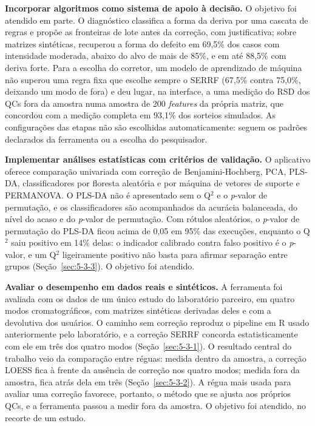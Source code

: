 \textbf{Incorporar algoritmos como sistema de apoio à decisão.} O objetivo foi atendido em parte. O diagnóstico classifica a forma da deriva por uma cascata de regras e propõe as fronteiras de lote antes da correção, com justificativa; sobre matrizes sintéticas, recuperou a forma do defeito em 69,5\% dos casos com intensidade moderada, abaixo do alvo de mais de 85\%, e em até 88,5\% com deriva forte. Para a escolha do corretor, um modelo de aprendizado de máquina não superou uma regra fixa que escolhe sempre o SERRF (67,5\% contra 75,0\%, deixando um modo de fora) e deu lugar, na interface, a uma medição do RSD dos QCs fora da amostra numa amostra de 200 \textit{features} da própria matriz, que concordou com a medição completa em 93,1\% dos sorteios simulados. As configurações das etapas não são escolhidas automaticamente: seguem os padrões declarados da ferramenta ou a escolha do pesquisador.

\textbf{Implementar análises estatísticas com critérios de validação.} O aplicativo oferece comparação univariada com correção de Benjamini-Hochberg, PCA, PLS-DA, classificadores por floresta aleatória e por máquina de vetores de suporte e PERMANOVA. O PLS-DA não é apresentado sem o Q$^{2}$ e o \textit{p}-valor de permutação, e os classificadores são acompanhados da acurácia balanceada, do nível do acaso e do \textit{p}-valor de permutação. Com rótulos aleatórios, o \textit{p}-valor de permutação do PLS-DA ficou acima de 0,05 em 95\% das execuções, enquanto o Q$^{2}$ saiu positivo em 14\% delas: o indicador calibrado contra falso positivo é o \textit{p}-valor, e um Q$^{2}$ ligeiramente positivo não basta para afirmar separação entre grupos (Seção~\ref{sec:5-3-3}). O objetivo foi atendido.

\textbf{Avaliar o desempenho em dados reais e sintéticos.} A ferramenta foi avaliada com os dados de um único estudo do laboratório parceiro, em quatro modos cromatográficos, com matrizes sintéticas derivadas deles e com a devolutiva dos usuários. O caminho sem correção reproduz o pipeline em R usado anteriormente pelo laboratório, e a correção SERRF concorda estatisticamente com ele em três dos quatro modos (Seção~\ref{sec:5-3-1}). O resultado central do trabalho veio da comparação entre réguas: medida dentro da amostra, a correção LOESS fica à frente da ausência de correção nos quatro modos; medida fora da amostra, fica atrás dela em três (Seção~\ref{sec:5-3-2}). A régua mais usada para avaliar uma correção favorece, portanto, o método que se ajusta aos próprios QCs, e a ferramenta passou a medir fora da amostra. O objetivo foi atendido, no recorte de um estudo.

